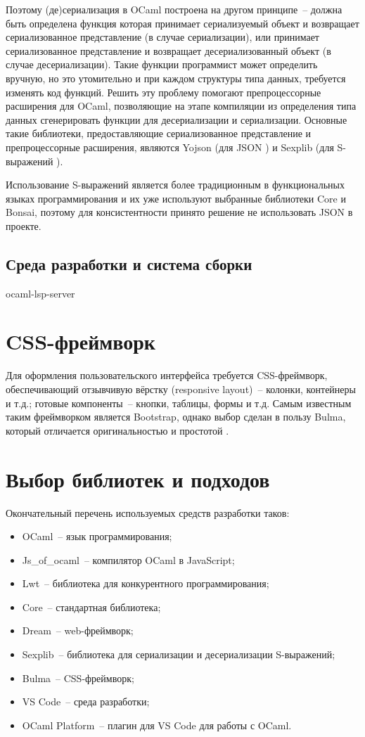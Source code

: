 Поэтому (де)сериализация в OCaml построена на другом принципе~-- должна быть определена функция которая
принимает сериализуемый объект и возвращает сериализованное представление (в случае сериализации),
или принимает сериализованное представление и возвращает десериализованный объект (в случае десериализации).
Такие функции программист может определить вручную, но это утомительно и при каждом структуры типа данных,
требуется изменять код функций. Решить эту проблему помогают препроцессорные расширения для OCaml, позволяющие
на этапе компиляции из определения типа данных сгенерировать функции для десериализации и сериализации.
Основные такие библиотеки, предоставляющие сериализованное представление и препроцессорные расширения,
являются Yojson (для JSON \cite{rwo-json}) и Sexplib (для S-выражений \cite{rwo-sexp}).

Использование S-выражений является более традиционным в функциональных языках программирования и их
уже используют выбранные библиотеки Core и Bonsai, поэтому для консистентности принято решение
не использовать JSON в проекте.

\subsection{Среда разработки и система сборки}

ocaml-lsp-server

\section{CSS-фреймворк}

Для оформления пользовательского интерфейса требуется CSS-фреймворк, обеспечивающий
отзывчивую вёрстку (responsive layout)~-- колонки, контейнеры и т.д.;
готовые компоненты~-- кнопки, таблицы, формы и т.д. Самым известным таким фреймворком является Bootstrap,
однако выбор сделан в пользу Bulma, который отличается оригинальностью и простотой \cite{bulma-vs-bootstrap}.

\section{Выбор библиотек и подходов}

Окончательный перечень используемых средств разработки таков:

\begin{itemize}
      \item OCaml~-- язык программирования;
      \item Js\_of\_ocaml~-- компилятор OCaml в JavaScript;
      \item Lwt~-- библиотека для конкурентного программирования;
      \item Core~-- стандартная библиотека;
      \item Dream~-- web-фреймворк;
      \item Sexplib~-- библиотека для сериализации и десериализации S-выражений;
      \item Bulma~-- CSS-фреймворк;
      \item VS Code~-- среда разработки;
      \item OCaml Platform~-- плагин для VS Code для работы с OCaml.
\end{itemize}

